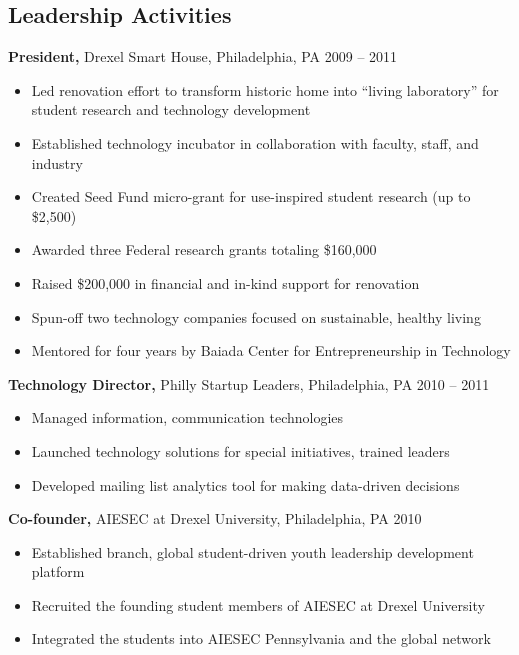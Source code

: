 \documentclass[margin]{res}
\begin{document}
\begin{resume}
\section{Leadership  Activities} 
     {\bf President,} Drexel Smart House, Philadelphia, PA \hfill 2009 -- 2011 %
     \begin{itemize} \itemsep -2pt
     \item Led renovation effort to transform historic home into ``living laboratory'' for student research and technology development 
     \item Established technology incubator in collaboration with faculty, staff, and industry
     \item Created Seed Fund micro-grant for use-inspired student research (up to \$2,500)   
     \item Awarded three Federal research grants totaling \$160,000
     \item Raised \$200,000 in financial and in-kind support for renovation
	\item Spun-off two technology companies focused on sustainable, healthy living
	\item Mentored for four years by Baiada Center for Entrepreneurship in Technology
	\end{itemize}

	{\bf  Technology Director,}  Philly Startup Leaders, Philadelphia, PA \hfill 2010 -- 2011 
	\begin{itemize} \itemsep -2pt
	\item Managed information, communication technologies 
	\item Launched technology solutions for special initiatives, trained leaders 
	\item Developed mailing list analytics tool for making data-driven decisions 
	\end{itemize}

     {\bf Co-founder,} AIESEC at Drexel University, Philadelphia, PA \hfill 2010 
     \begin{itemize} \itemsep -2pt
     \item Established branch, global student-driven youth leadership development platform
     \item Recruited the founding student members of AIESEC at Drexel University
	\item Integrated the students into AIESEC Pennsylvania and the global network
	\end{itemize}


\end{resume}
\end{document}
